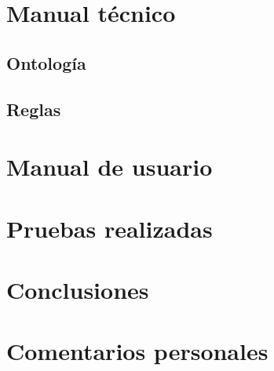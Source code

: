 \documentclass{uc3mpracticas}
\begin{document}
  \section{Manual técnico}

  \subsection{Ontología}

  \subsection{Reglas}


  \section{Manual de usuario}

  \section{Pruebas realizadas}

  \section{Conclusiones}

  \section{Comentarios personales}
\end{document}
